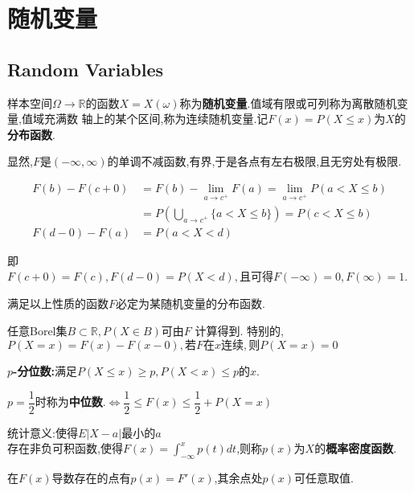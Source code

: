 \section{随机变量}
\subsection{Random Variables}
样本空间$ \Omega \rightarrow \mathbb{R}$的函数$ X = X(\omega)$称为\textbf{随机变量}.值域有限或可列称为离散随机变量,值域充满数
轴上的某个区间,称为连续随机变量.记$ F(x) = P(X \le x)$为$ X$的\textbf{分布函数}.

显然,$ F$是$ (-\infty, \infty)$的单调不减函数,有界,于是各点有左右极限,且无穷处有极限.

\begin{equation*}
	\begin{split} 
		F(b) - F(c + 0) & = F(b) - \lim \limits_{a \to c^{+}} F(a) =\lim \limits_{a \to c^{+}}P(a < X \le b) \\
		                & = P(\bigcup_{a \to c^{+}}\{a < X \le b\}) = P(c < X \le b)                         \\
		F(d - 0) - F(a) & = P(a < X < d)
	\end{split}
\end{equation*}

即$ F(c + 0) = F(c), F(d - 0) = P(X<d), 且可得F(-\infty) = 0, F(\infty) = 1$.

满足以上性质的函数$ F$必定为某随机变量的分布函数.

任意Borel集$ B\subset \mathbb{R}, P(X \in B) 可由F$ 计算得到.
特别的,$ P(X=x) = F(x) - F(x - 0),若F在x连续,则P(X=x) = 0$

\textbf{$p$-分位数:}满足$ P(X \le x) \ge p, P(X <x) \le p 的x. $ 

$ p =\dfrac{1}{2}$时称为\textbf{中位数}.$\Leftrightarrow \dfrac{1}{2} \le F(x) \le \dfrac{1}{2} + P(X=x) $

统计意义:使得$E|X-a|$最小的$a$
\\

存在非负可积函数,使得$ F(x) = \int_{-\infty}^{x}{p(t)dt}$,则称$ p(x)$为$ X$的\textbf{概率密度函数}.

在$ F(x)$导数存在的点有$ p(x) = F'(x)$,其余点处$ p(x)$可任意取值.

